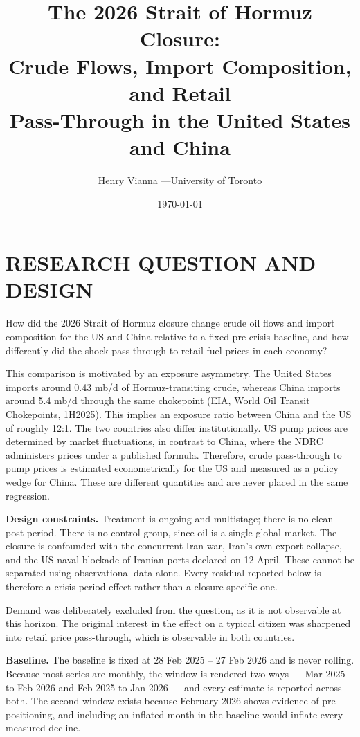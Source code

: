 \documentclass[11pt]{article}
\title{\vspace{-2.2em}\textbf{The 2026 Strait of Hormuz Closure:\\Crude Flows, Import Composition, and Retail\\Pass-Through in the United States and China}\vspace{-0.4em}}
\author{Henry Vianna \quad---\quad University of Toronto}
\date{\today}
\begin{document}
\maketitle
\vspace{-1.5em}

\section{RESEARCH QUESTION AND DESIGN}

How did the 2026 Strait of Hormuz closure change crude oil flows and
import composition for the US and China relative to a fixed pre-crisis
baseline, and how differently did the shock pass through to retail fuel
prices in each economy?

This comparison is motivated by an exposure asymmetry. The United States
imports around 0.43 mb/d of Hormuz-transiting crude, whereas China
imports around 5.4 mb/d through the same chokepoint (EIA, World Oil
Transit Chokepoints, 1H2025). This implies an exposure ratio between
China and the US of roughly 12:1. The two countries also differ
institutionally. US pump prices are determined by market fluctuations,
in contrast to China, where the NDRC administers prices under a
published formula. Therefore, crude pass-through to pump prices is
estimated econometrically for the US and measured as a policy wedge for
China. These are different quantities and are never placed in the same
regression.

\textbf{Design constraints.} Treatment is ongoing and multistage; there
is no clean post-period. There is no control group, since oil is a
single global market. The closure is confounded with the concurrent
Iran war, Iran's own export collapse, and the US naval blockade of
Iranian ports declared on 12 April. These cannot be separated using
observational data alone. Every residual reported below is therefore a
crisis-period effect rather than a closure-specific one.

Demand was deliberately excluded from the question, as it is not
observable at this horizon. The original interest in the effect on a
typical citizen was sharpened into retail price pass-through, which is
observable in both countries.

\textbf{Baseline.} The baseline is fixed at 28 Feb 2025 -- 27 Feb 2026
and is never rolling. Because most series are monthly, the window is
rendered two ways --- Mar-2025 to Feb-2026 and Feb-2025 to Jan-2026 ---
and every estimate is reported across both. The second window exists
because February 2026 shows evidence of pre-positioning, and including
an inflated month in the baseline would inflate every measured decline.
\end{document}
